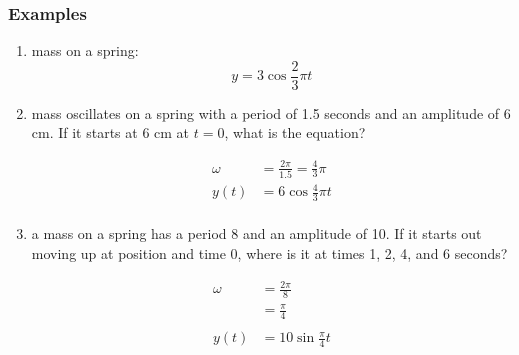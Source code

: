 \documentclass{exam}
\begin{document}
  \subsubsection{Examples}
  \begin{enumerate}
    \item mass on a spring:
      \[
        y = 3 \cos \frac{2}{3} \pi t
      \]

    \item mass oscillates on a spring with a period of 1.5 seconds and an amplitude of 6 cm.  
      If it starts at 6 cm at $t = 0$, what is the equation?

      \begin{solution}
        \begin{align*}
          \omega & = \frac{2 \pi}{1.5} = \frac{4}{3} \pi \\
          y(t)   & = 6 \cos \frac{4}{3} \pi t \\
        \end{align*}
      \end{solution}

    \item a mass on a spring has a period 8 and an amplitude of 10.  If it starts out moving up at position and time 0,
      where is it at times 1, 2, 4, and 6 seconds?

      \begin{solution}
        \begin{align*}
          \omega & = \frac{2 \pi}{8} \\
                 & = \frac{\pi}{4} \\
          \\
          y(t)   & = 10 \sin \frac{\pi}{4} t \\
        \end{align*}


\end{solution}
\end{enumerate}
\end{document}
